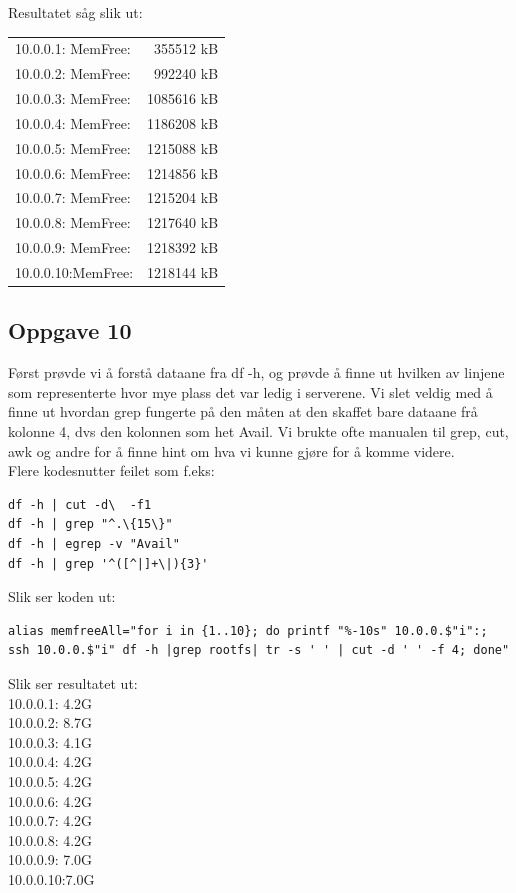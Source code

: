 \documentclass[a4paper, norsk, 12pt]{article}
\begin{document}
Resultatet såg slik ut:\\
\begin{tabular}{lr}
10.0.0.1: MemFree: &         355512 kB\\
10.0.0.2: MemFree: &         992240 kB\\
10.0.0.3: MemFree: &        1085616 kB\\
10.0.0.4: MemFree: &        1186208 kB\\
10.0.0.5: MemFree: &        1215088 kB\\
10.0.0.6: MemFree: &        1214856 kB\\
10.0.0.7: MemFree: &        1215204 kB\\
10.0.0.8: MemFree: &        1217640 kB\\
10.0.0.9: MemFree: &        1218392 kB\\
10.0.0.10:MemFree: &        1218144 kB
\end{tabular}

\subsection{Oppgave 10}
Først prøvde vi å forstå dataane fra df -h, og prøvde å finne ut hvilken av linjene som representerte hvor mye plass det var ledig i serverene. Vi slet veldig med å finne ut hvordan grep fungerte på den måten at den skaffet bare dataane frå kolonne 4, dvs den kolonnen som het Avail. Vi brukte ofte manualen til grep, cut, awk og andre for å finne hint om hva vi kunne gjøre for å komme videre.\\

Flere kodesnutter feilet som f.eks:\\
\begin{verbatim}
df -h | cut -d\  -f1
df -h | grep "^.\{15\}"
df -h | egrep -v "Avail"
df -h | grep '^([^|]+\|){3}'
\end{verbatim}

Slik ser koden ut:\\
\begin{verbatim}
alias memfreeAll="for i in {1..10}; do printf "%-10s" 10.0.0.$"i":; 
ssh 10.0.0.$"i" df -h |grep rootfs| tr -s ' ' | cut -d ' ' -f 4; done"
\end{verbatim}

Slik ser resultatet ut:\\
10.0.0.1: 4.2G\\
10.0.0.2: 8.7G\\
10.0.0.3: 4.1G\\
10.0.0.4: 4.2G\\
10.0.0.5: 4.2G\\
10.0.0.6: 4.2G\\
10.0.0.7: 4.2G\\
10.0.0.8: 4.2G\\
10.0.0.9: 7.0G\\
10.0.0.10:7.0G
\end{document}
